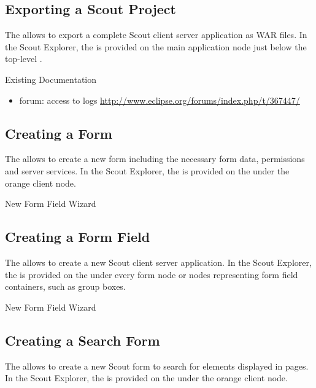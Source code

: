 \documentclass[a4paper,10pt,twoside]{book}
\begin{document}
\subsection{Exporting a Scout Project}

The  allows to export a complete Scout client server application as WAR files. 
In the Scout Explorer, the  is provided on the main application node just below the top-level . 

\noindent Existing Documentation
\begin{itemize}
  \item forum: access to logs \url{http://www.eclipse.org/forums/index.php/t/367447/}
\end{itemize}

\subsection{Creating a Form}

The  allows to create a new form including the necessary form data, permissions and server services. 
In the Scout Explorer, the  is provided on the  under the orange client node. 

New Form Field Wizard

\subsection{Creating a Form Field}

The  allows to create a new Scout client server application. 
In the Scout Explorer, the  is provided on the  under every form node or nodes representing form field containers, such as group boxes. 

New Form Field Wizard

\subsection{Creating a Search Form}

The  allows to create a new Scout form to search for elements displayed in pages.  
In the Scout Explorer, the  is provided on the  under the orange client node. 
\end{document}
